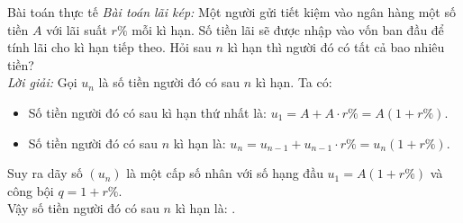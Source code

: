 \begin{dang}{Bài toán thực tế}
	\textit{Bài toán lãi kép:} Một người gửi tiết kiệm vào ngân hàng một số tiền $A$ với lãi suất $r\%$ mỗi kì hạn. Số tiền lãi sẽ được nhập vào vốn ban đầu để tính lãi cho kì hạn tiếp theo. Hỏi sau $n$ kì hạn thì người đó có tất cả bao nhiêu tiền?\\
	\textit{Lời giải:} Gọi $u_n$ là số tiền người đó có sau $n$ kì hạn. Ta có:
	\begin{itemize}
		\item Số tiền người đó có sau kì hạn thứ nhất là: $u_1=A+A\cdot r\%=A\left(1+r\%\right)$.
		\item Số tiền người đó có sau $n$ kì hạn là: $u_n=u_{n-1}+u_{n-1}\cdot r\%=u_n\left(1+r\%\right)$.
	\end{itemize}
	Suy ra dãy số $(u_n)$ là một cấp số nhân với số hạng đầu $u_1=A\left(1+r\%\right)$ và công bội $q=1+r\%$.\\
	Vậy số tiền người đó có sau $n$ kì hạn là: .
\end{dang}
